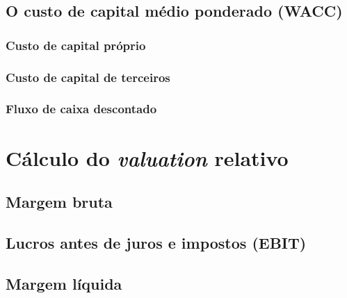 \documentclass[grad,numbers]{coppe}
\begin{document}
  \hypertarget{o-custo-de-capital-muxe9dio-ponderado-wacc}{%
  \subsection{O custo de capital médio ponderado (WACC)}\label{o-custo-de-capital-muxe9dio-ponderado-wacc}}

  \hypertarget{custo-de-capital-pruxf3prio}{%
  \subsubsection{Custo de capital próprio}\label{custo-de-capital-pruxf3prio}}

  \hypertarget{custo-de-capital-de-terceiros}{%
  \subsubsection{Custo de capital de terceiros}\label{custo-de-capital-de-terceiros}}

  \hypertarget{fluxo-de-caixa-descontado}{%
  \subsubsection{Fluxo de caixa descontado}\label{fluxo-de-caixa-descontado}}

  \hypertarget{cuxe1lculo-do-valuation-relativo}{%
  \section{\texorpdfstring{Cálculo do \emph{valuation} relativo}{Cálculo do valuation relativo}}\label{cuxe1lculo-do-valuation-relativo}}

  \hypertarget{margem-bruta}{%
  \subsection{Margem bruta}\label{margem-bruta}}

  \hypertarget{lucros-antes-de-juros-e-impostos-ebit}{%
  \subsection{Lucros antes de juros e impostos (EBIT)}\label{lucros-antes-de-juros-e-impostos-ebit}}

  \hypertarget{margem-luxedquida}{%
  \subsection{Margem líquida}\label{margem-luxedquida}}
\end{document}
